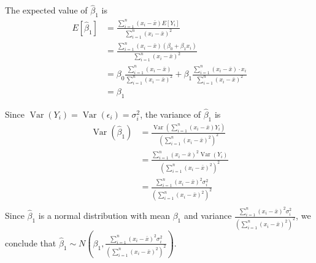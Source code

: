\documentclass{article}
\newcommand{\var}{\operatorname{Var}}
\newcommand{\sumN}{\sum_{i=1}^{n}}
\begin{document}
The expected value of $\hat{\beta}_1$ is 
\begin{align*}
	E[\hat{\beta}_1] &= \frac{\sumN (x_i - \bar{x})E[Y_i]}{\sumN (x_i - \bar{x})^2}  \\
	&= \frac{\sumN (x_i - \bar{x})(\beta_0 + \beta_1 x_i)}{\sumN (x_i - \bar{x})^2}  \\
	&= \beta_0 \frac{\sumN (x_i - \bar{x})}{\sumN (x_i - \bar{x})^2}
		+ \beta_1 \frac{\sumN (x_i - \bar{x})\cdot x_i}{\sumN (x_i - \bar{x})^2} \\
	&= \beta_1
\end{align*}

Since $\var(Y_i) = \var(\epsilon_i) = \sigma_i^2$, the variance of $\hat{\beta}_1$ is 
\begin{align*}
	\var(\hat{\beta}_1) &= \frac{\var(\sumN (x_i - \bar{x})Y_i)}{(\sumN (x_i - \bar{x})^2)^2} \\
	&= \frac{\sumN (x_i - \bar{x})^2 \var(Y_i)}{(\sumN (x_i - \bar{x})^2)^2} \\
	&= \frac{\sumN (x_i - \bar{x})^2\sigma_i^2}{(\sumN (x_i - \bar{x})^2)^2} \\
\end{align*}
Since $\hat{\beta}_1$ is a normal distribution with mean $\beta_1$ and
variance $\frac{\sumN (x_i - \bar{x})^2\sigma_i^2}{(\sumN (x_i - \bar{x})^2)^2}$, 
we conclude that $\hat{\beta}_1 \sim N(\beta_1, \frac{\sumN (x_i - \bar{x})^2\sigma_i^2}{(\sumN (x_i - \bar{x})^2)^2} )$.
\end{document}
